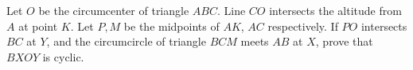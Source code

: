 Let $O$ be the circumcenter of triangle $ABC$. Line $CO$ intersects the altitude from $A$ at point $K$. Let $P,M$ be the midpoints of $AK$,  $AC$ respectively. If $PO$ intersects $BC$ at $Y$,  and the circumcircle of triangle $BCM$ meets $AB$ at $X$,  prove that $BXOY$ is cyclic.